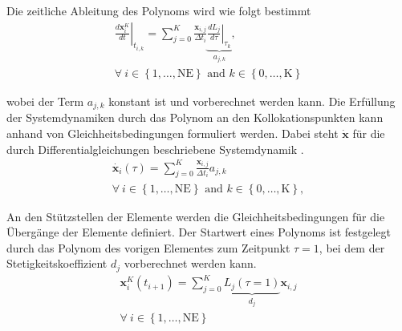 Die zeitliche Ableitung des Polynoms wird wie folgt bestimmt
\begin{equation} \label{eq_AbleitungPolynomKollok}
    \begin{gathered}
        \left.\frac{d \boldsymbol{x}_i^K}{d t}\right|_{t_{i, k}}=\sum_{j=0}^K \frac{\boldsymbol{x}_{i, j}}{\Delta t_i} \underbrace{\left.\frac{d L_j}{d \tau}\right|_{\tau_k}}_{a_{j,k}},\\
        \forall~i\in \left\{1, \ldots, \mathrm{NE}\right\}\text{ and }k\in \left\{0, \ldots, \mathrm{K}\right\}
    \end{gathered}
\end{equation}

\vspace*{-\baselineskip}wobei der Term $a_{j,k}$ konstant ist und vorberechnet werden kann.
Die Erfüllung der Systemdynamiken durch das Polynom an den Kollokationspunkten kann anhand von Gleichheitsbedingungen formuliert werden.
Dabei steht $\boldsymbol{\dot{x}}$ für die durch Differentialgleichungen beschriebene Systemdynamik \cite[S.70]{DissGall}.
\begin{equation} \label{eq_GleichheitsbedAbleitungKollok}
    \begin{gathered}
        \dot{\boldsymbol{x}_i}(\tau) = \sum_{j=0}^K \frac{\boldsymbol{x}_{i, j}}{\Delta t_i} a_{j,k}\\
        \forall~i\in \left\{1, \ldots, \mathrm{NE}\right\}\text{ and }k\in \left\{0, \ldots, \mathrm{K}\right\},
    \end{gathered}
\end{equation}

An den Stützstellen der Elemente werden die Gleichheitsbedingungen für die Übergänge der Elemente definiert.
Der Startwert eines Polynoms ist festgelegt durch das Polynom des vorigen Elementes zum Zeitpunkt $\tau=1$, bei dem der Stetigkeitskoeffizient $d_j$ vorberechnet werden kann.
\begin{equation} \label{eq_GleichheitsbedZustandKollok}
    \begin{gathered}
        \boldsymbol{x}_i^K\left(t_{i+1}\right)=\sum_{j=0}^K \underbrace{L_j(\tau=1)}_{d_j} \boldsymbol{x}_{i, j}\\
        \forall~i\in \left\{1, \ldots, \mathrm{NE}\right\}
    \end{gathered}
\end{equation}

